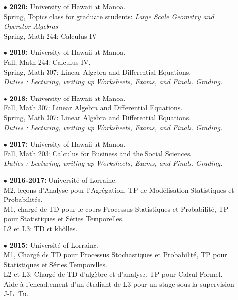 \documentclass[a4paper,11pt]{article}
\begin{document}
\begin{itemize}

\item[$\bullet$] \textbf{2020:} University of Hawaii at Manoa.\\
				Spring, Topics class for graduate students: \textit{Large Scale Geometry and Operator Algebras}\\
				Spring, Math 244: Calculus IV\\
\item[$\bullet$] \textbf{2019:} University of Hawaii at Manoa.\\
					Fall, Math 244: Calculus IV.\\
					Spring, Math 307: Linear Algebra and Differential Equations.\\
					\textit{Duties : Lecturing, writing up Worksheets, Exams, and Finals. Grading.}\\

\item[$\bullet$] \textbf{2018:} University of Hawaii at Manoa.\\
					Fall, Math 307: Linear Algebra and Differential Equations.\\
					Spring, Math 307: Linear Algebra and Differential Equations.\\
					\textit{Duties : Lecturing, writing up Worksheets, Exams, and Finals. Grading.}\\

\item[$\bullet$] \textbf{2017:} University of Hawaii at Manoa.\\
					Fall, Math 203: Calculus for Business and the Social Sciences.\\
					\textit{Duties : Lecturing, writing up Worksheets, Exams, and Finals. Grading.}\\

\item[$\bullet$] \textbf{2016-2017:} Universit\'e of Lorraine.\\
					M2, le\c{c}ons d'Analyse pour l'Agrégation, TP de Mod\'elisation Statistiques et Probabilit\'es.\\
					M1,	charg\'e de TD pour le cours Processus Statistiques et Probabilit\'e, TP pour Statistiques et S\'eries Temporelles. \\
					L2 et L3: TD et kh\^{o}lles. \\  
\item[$\bullet$] \textbf{2015:} Universit\'e of Lorraine.\\
					M1, Charg\'e de TD pour Processus Stochastiques et Probabilit\'e, TP pour Statistiques et S\'eries Temporelles.\\
					L2 et L3: Charg\'e de TD d'alg\`ebre et d'analyse. TP pour Calcul Formel.\\ 
					Aide \`a l'encadrement d'un \'etudiant de L3 pour un stage sous la supervision J-L. Tu.\\
					

\end{itemize}
\end{document}
